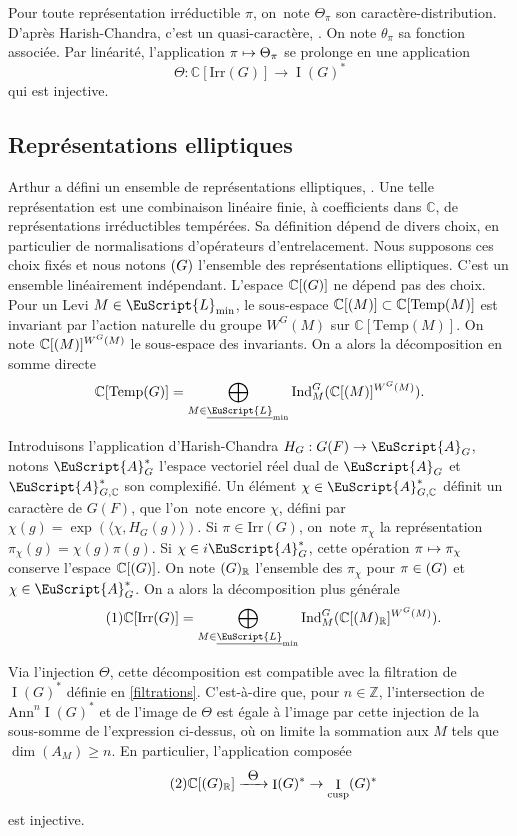 \documentclass[JEP,XML,SOM,Unicode,francais]{cedram}
\let\mathcal \EuScript
\newcommand{\NoChangel}[1]{%
\expandafter\let\csname old\string#1\endcsname=#1
\let#1=\relax
\newcommand{#1}{\mathcode`l="716C\csname old\string#1\endcsname\mathcode`l="7160 }%
}
\let\<\langle
\let\>\rangle
\let\oldS\S
\renewcommand{\S}{\oldS\,}
\newcommand\mto{\mathchoice{\longmapsto}{\mapsto}{\mapsto}{\mapsto}}
\def\To#1{\mathchoice{\xrightarrow{\textstyle\kern4pt#1\kern3pt}}{\stackrel{#1}{\longrightarrow}}{}{}}
\newcommand{\Ann}{\mathrm{Ann}}
\newcommand{\cusp}{\mathrm{cusp}}
\newcommand{\Ell}{\mathrm{Ell}} \NoChangel{\Ell}
\newcommand{\Ind}{\mathrm{Ind}}
\newcommand{\Irr}{\mathrm{Irr}}
\newcommand{\Temp}{\mathrm{Temp}}
\DeclareMathOperator{\rI}{I}
\newcommand{\cA}{\mathcal{A}}
\newcommand{\cL}{\mathcal{L}}
\newcommand{\CC}{\mathbb{C}}
\newcommand{\ZZ}{\mathbb{Z}}
\newcommand{\RR}{\mathbb{R}}
\theoremstyle{plain}
\theoremstyle{definition}
\begin{document}
Pour toute représentation irréductible $\pi$, on~note $\Theta_{\pi}$
son caractère-distribution. D'après Harish-Chandra, c'est un quasi-caractère, \cf \cite[Th.\,16.2]{HC}. On note $\theta_{\pi}$ sa fonction associée. Par linéarité, l'application $\pi\mto \Theta_{\pi}$ se prolonge en une application
\[
\Theta:\CC[\Irr(G)]\to \rI(G)^*
\]
qui est injective.

\subsection{Représentations elliptiques}\label{representationselliptiques}
Arthur a défini un ensemble de \og représentations elliptiques\fg, \cf \cite[\S3]{A2}. Une telle représentation est une combinaison linéaire finie, à coefficients dans $\CC$, de représentations irréductibles tempérées. Sa définition dépend de divers choix, en particulier de normalisations d'opérateurs d'entrelacement. Nous supposons ces choix fixés et nous notons $\Ell(G)$ l'ensemble des représentations ellip\-ti\-ques. C'est un ensemble linéairement indépendant. L'espace $\CC[\Ell(G)]$ ne dépend pas des choix. Pour un Levi $M\in \cL_{\min}$, le sous-espace $\CC[\Ell(M)]\subset \CC[\Temp(M)]$ est invariant par l'action naturelle du groupe $ W^G(M)$ sur $\CC[\Temp(M)]$. On note $\CC[\Ell(M)]^{W^G(M)}$ le sous-espace des invariants. On a alors la décomposition en somme directe
\[
\CC[\Temp(G)]=\bigoplus_{M\in\underline{\cL}_{\min}}\Ind_{M}^G(\CC[\Ell(M)]^{W^G(M)}).
\]

Introduisons l'application d'Harish-Chandra $H_{G}:G(F)\to \cA_{G}$, notons $\cA_{G}^*$ l'espace vectoriel réel dual de $\cA_{G}$ et $\cA_{G,\CC}^*$ son complexifié. Un élément $\chi\in \cA_{G,\CC}^*$ définit un caractère de $G(F)$, que l'on~note encore $\chi$, défini par $\chi(g)=\exp(\<\chi,H_{G}(g)\>)$. Si $\pi\in \Irr(G)$, on~note $\pi_{\chi}$ la représentation $\pi_{\chi}(g)=\chi(g)\pi(g)$. Si $\chi\in i\cA_{G}^*$, cette opération $\pi\mto \pi_{\chi}$ conserve l'espace $\CC[\Ell(G)]$. On note $\Ell(G)_{\RR}$ l'ensemble des $\pi_{\chi}$ pour $\pi\in \Ell(G)$ et $\chi\in \cA_{G}^*$. On a alors la décomposition plus générale
\begin{equation}\tag{1}\label{representationselliptiques1}
\CC[\Irr(G)]=\bigoplus_{M\in\underline{\cL}_{\min}}\Ind_{M}^G(\CC[\Ell(M)_{\RR}]^{W^G(M)}).
\end{equation}

Via l'injection $\Theta$, cette décomposition est compatible avec la filtration de $\rI(G)^*$ définie en \ref{filtrations}. C'est-à-dire que, pour $n\in \ZZ$, l'intersection de $\Ann^n\rI(G)^*$ et de l'image de $\Theta$ est égale à l'image par cette injection de la sous-somme de l'expression ci-dessus, où on limite la sommation aux $M$ tels que $\dim(A_{M})\geq n$. En particulier, l'application composée
\begin{equation}\tag{2}\label{representationselliptiques2}
\CC[\Ell(G)_{\RR}]\To{\Theta}\rI(G)^*\to \rI_{\cusp}(G)^*
\end{equation}
est injective.
\end{document}
